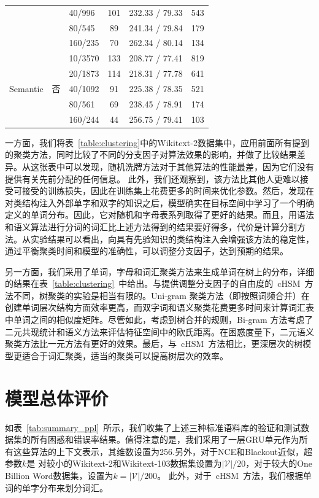 \begin{table}[!ht]
\begin{tabular}{lclccc}
    &&40/996 &101&232.33 / 79.33&543\\
    &&80/545 &89&241.34 / 79.84&179\\
    &&160/235 &70&262.34 / 80.14&134\\
  \midrule
  \multirow{5}{*}{Semantic}  &\multirow{5}{*}{否} &10/3570 &133&208.77 / 77.41&819\\
    & &20/1873 &114&218.31 / 77.78&641\\
    & &40/1092 &91&225.38 / 78.35&521\\
    & &80/561 &69&238.45 / 78.91&174\\
    & &160/244 &44&256.75 / 79.41&103\\
\bottomrule
  \end{tabular}
\end{table}

一方面，我们将表~\ref{table:clustering}中的Wikitext-2数据集中，应用前面所有提到的聚类方法，同时比较了不同的分支因子对算法效果的影响，并做了比较结果差异。从这张表中可以发现，随机洗牌方法对于其他算法的性能最差，因为它们没有提供有关先前分配的任何信息。
此外，我们还观察到，该方法比其他人更难以接受可接受的训练损失，因此在训练集上花费更多的时间来优化参数。然后，发现在对类结构注入外部单字和双字的知识之后，模型确实在目标空间中学习了一个明确定义的单词分布。因此，它对随机和字母表系列取得了更好的结果。而且，用语法和语义算法进行分词的词汇比上述方法得到的结果要好得多，代价是计算分割方法。从实验结果可以看出，向具有先验知识的类结构注入会增强该方法的稳定性，通过平衡聚类时间和模型的准确性，可以调整分支因子，达到预期的结果。



另一方面，我们采用了单词，字母和词汇聚类方法来生成单词在树上的分布，详细的结果在表~\ref{table:clustering}~中给出。与提供调整分支因子的自由度的~cHSM~方法不同，树聚类的实验是相当有限的。Uni-gram 聚类方法（即按照词频合并）在创建单词层次结构方面效率更高，而双字词和语义聚类花费更多时间来计算词汇表中单词之间的相似度矩阵。尽管如此，考虑到树合并的规则，Bi-gram 方法考虑了二元共现统计和语义方法来评估特征空间中的欧氏距离。在困惑度量下，二元语义聚类方法比一元方法有更好的效果。最后，与~cHSM~方法相比，更深层次的树模型更适合于词汇聚类，适当的聚类可以提高树层次的效率。

\section{模型总体评价}
如表~\ref{tab:summary_ppl}~所示，我们收集了上述三种标准语料库的验证和测试数据集的所有困惑和错误率结果。值得注意的是，我们采用了一层GRU单元作为所有这些算法的上下文表示，其维数设置为256.另外，对于NCE和Blackout近似，超参数$ k $是 对较小的Wikitext-2和Wikitext-103数据集设置为$\mathcal{|V|}/20 $，对于较大的One Billion Word数据集，设置为$ k=|\mathcal{V}|/200 $。 此外，对于~cHSM~方法，我们根据单词的单字分布来划分词汇。

